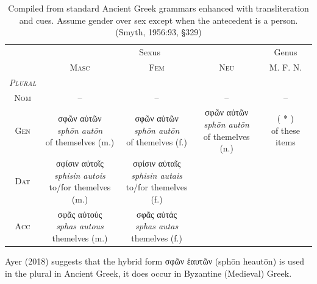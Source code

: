 \documentclass[10pt,a4paper,notitlepage]{article}
\newcommand{\tsc}[1]{\textsc{#1}}
\newcommand*{\grc}[1]{\fontspec{Inter}#1\rmfamily}
\newcommand{\trc}[1]{\textit{\fontspec{Tinos}#1}}
\begin{document}
    \begin{table}[H]
        \begin{tabular}{c|ccc|c}
            & \multicolumn{3}{c|}{Sexus} & Genus \\
            & \tsc{Masc} & \tsc{Fem} & \tsc{Neu} & \tsc{M. F. N.} \\
            \hline
            \emph{\tsc{Plural}} & & & & \\
            \tsc{Nom} & -- & -- & -- & -- \\
            \tsc{Gen} & \makecell{\grc{σφῶν αὐτῶν} \\ \trc{sphōn autōn} \\ \small of themselves (m.)}
                    & \makecell{\grc{σφῶν αὐτῶν} \\ \trc{sphōn autōn} \\ \small of themelves (f.)}
                    & \makecell{\grc{σφῶν αὐτῶν} \\ \trc{sphōn autōn} \\ \small of themelves (n.)}
                    & \makecell{( * ) \\ \small of these items} \\
            \tsc{Dat} & \makecell{\grc{σφίσιν αὐτοῖς} \\ \trc{sphisin autois} \\ \small to/for themelves (m.)}
                    & \makecell{\grc{σφίσιν αὐταῖς} \\ \trc{sphisin autais} \\ \small to/for themelves (f.)}
                    & \makecell{--}
                    & \makecell{--} \\
            \tsc{Acc} & \makecell{\grc{σφᾶς αὐτούς} \\ \trc{sphas autous} \\ \small themelves (m.)}
                    & \makecell{\grc{σφᾶς αὐτάς} \\ \trc{sphas autas} \\ \small themelves (f.)}
                    & \makecell{--}
                    & \makecell{--} \\
        \end{tabular}
         \caption{Compiled from standard Ancient Greek grammars enhanced with transliteration and cues.
            Assume gender over sex except when the antecedent is a person.
             (Smyth, 1956:93, \S329)}
     \end{table}

    Ayer (2018) suggests that the hybrid form \grc{σφῶν ἑαυτῶν} (sphōn heautōn) is used in the plural in Ancient Greek,
    it does occur in Byzantine (Medieval) Greek.
\end{document}

